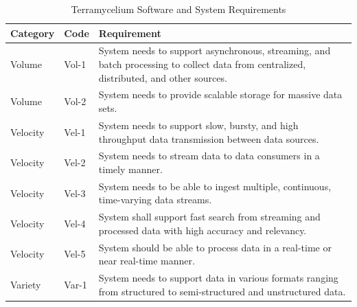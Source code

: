 \documentclass{ieeeaccess}
\begin{document}
\begin{table}

  \renewcommand{\arraystretch}{1.3}

  \caption{Terramycelium Software and System Requirements}

  \label{table:systemRequirements}

  \centering

  \begin{tabular}{|l|l|p{10cm}|}

  \hline

  \textbf{Category} & \textbf{Code} & \textbf{Requirement} \\

  \hline

  Volume & Vol-1 & System needs to support asynchronous, streaming, and batch processing to collect data from centralized, distributed, and other sources. \\

  \hline

  Volume & Vol-2 & System needs to provide scalable storage for massive data sets. \\

  \hline

  Velocity & Vel-1 & System needs to support slow, bursty, and high throughput data transmission between data sources. \\

  \hline

  Velocity & Vel-2 & System needs to stream data to data consumers in a timely manner. \\

  \hline

  Velocity & Vel-3 & System needs to be able to ingest multiple, continuous, time-varying data streams. \\

  \hline

  Velocity & Vel-4 & System shall support fast search from streaming and processed data with high accuracy and relevancy. \\

  \hline

  Velocity & Vel-5 & System should be able to process data in a real-time or near real-time manner. \\

  \hline

  Variety & Var-1 & System needs to support data in various formats ranging from structured to semi-structured and unstructured data. \\


\end{tabular}
\end{table}
\end{document}
